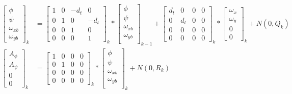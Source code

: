 \begin{align}
    \begin{bmatrix}
        \phi\\
        \psi\\
        \omega_{xb}\\
        \omega_{yb}
    \end{bmatrix}_k &=
    \begin{bmatrix}
        1 & 0 & -d_t & 0 \\
        0 & 1 & 0 & -d_t \\
        0 & 0 & 1 & 0 \\
        0 & 0 & 0 & 1
    \end{bmatrix}_k *
    \begin{bmatrix}
        \phi\\
        \psi\\
        \omega_{xb}\\
        \omega_{yb}\\
    \end{bmatrix}_{k-1}
    +
    \begin{bmatrix}
        d_t & 0 & 0 & 0 \\
        0 & d_t & 0 & 0 \\
        0 & 0 & 0 & 0   \\
        0 & 0 & 0 & 0
    \end{bmatrix}_k *
    \begin{bmatrix}
        \omega_{x}\\
        \omega_{y}\\
        0 \\
        0
    \end{bmatrix}_{k}
    +
    N(0, Q_k) \\
    \begin{bmatrix}
        A_\phi\\
        A_\psi\\
        0\\
        0
    \end{bmatrix}_k &=
    \begin{bmatrix}
        1 & 0 & 0 & 0 \\
        0 & 1 & 0 & 0 \\
        0 & 0 & 0 & 0 \\
        0 & 0 & 0 & 0
    \end{bmatrix}_k *
    \begin{bmatrix}
        \phi\\
        \psi\\
        \omega_{xb}\\
        \omega_{yb}\\
    \end{bmatrix}_{k}
    +
    N(0,R_k)
\end{align}

